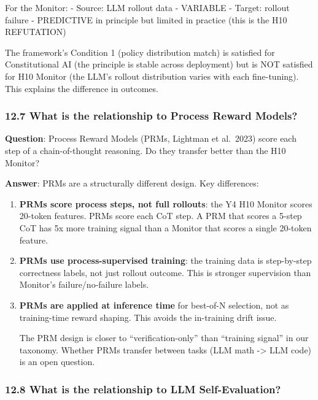 \documentclass[11pt]{article}
\begin{document}
For the Monitor: - Source: LLM rollout data - VARIABLE - Target: rollout
failure - PREDICTIVE in principle but limited in practice (this is the
H10 REFUTATION)

The framework's Condition 1 (policy distribution match) is satisfied for
Constitutional AI (the principle is stable across deployment) but is NOT
satisfied for H10 Monitor (the LLM's rollout distribution varies with
each fine-tuning). This explains the difference in outcomes.

\subsubsection{12.7 What is the relationship to Process Reward
Models?}\label{what-is-the-relationship-to-process-reward-models}

\textbf{Question}: Process Reward Models (PRMs, Lightman et al.~2023)
score each step of a chain-of-thought reasoning. Do they transfer better
than the H10 Monitor?

\textbf{Answer}: PRMs are a structurally different design. Key
differences:

\begin{enumerate}
\def\labelenumi{\arabic{enumi}.}
\item
  \textbf{PRMs score process steps, not full rollouts}: the Y4 H10
  Monitor scores 20-token features. PRMs score each CoT step. A PRM that
  scores a 5-step CoT has 5x more training signal than a Monitor that
  scores a single 20-token feature.
\item
  \textbf{PRMs use process-supervised training}: the training data is
  step-by-step correctness labels, not just rollout outcome. This is
  stronger supervision than Monitor's failure/no-failure labels.
\item
  \textbf{PRMs are applied at inference time} for best-of-N selection,
  not as training-time reward shaping. This avoids the in-training drift
  issue.

  The PRM design is closer to ``verification-only'' than ``training
  signal'' in our taxonomy. Whether PRMs transfer between tasks (LLM
  math -\textgreater{} LLM code) is an open question.
\end{enumerate}

\subsubsection{12.8 What is the relationship to LLM
Self-Evaluation?}\label{what-is-the-relationship-to-llm-self-evaluation}
\end{document}
